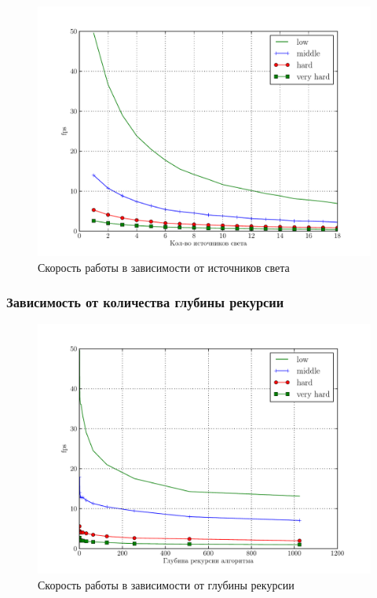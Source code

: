 \documentclass[12pt, a4paper, utf8]{article}
\begin{document}
\begin{figure}[H]
\centering
\includegraphics[width=\textwidth]{perf/performance_light.pdf}
\caption{Скорость работы в зависимости от источников света}\label{fig:performance_light}
\end{figure}

\subsubsection{Зависимость от количества глубины рекурсии}



\begin{figure}[H]
\centering
\includegraphics[width=\textwidth]{perf/performance_d.pdf}
\caption{Скорость работы в зависимости от глубины рекурсии}\label{fig:performance_d}
\end{figure}
\end{document}
